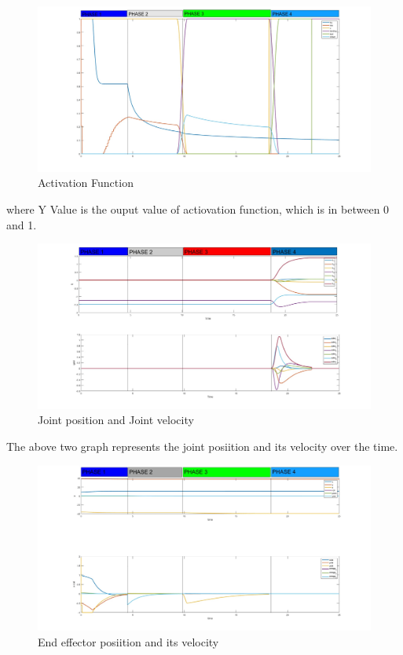 \documentclass{article}
\begin{document}
\begin{figure}[h]
	\centering
	\includegraphics[width=1\textwidth]{imgs/ex1/activation function.jpg}
	\caption{\label{fig:1} Activation Function}
\end{figure}
\noindent
where Y Value is the ouput value of actiovation function, which is in between 0 and 1. 

\begin{figure}[h]
	\centering
	\includegraphics[width=1\textwidth]{imgs/ex1/q and qdot.jpg}
	\caption{\label{fig:2} Joint position and Joint velocity} 
\end{figure}
The above two graph represents the joint posiition and its velocity over the time. 
\begin{figure}[h]
	\centering
	\includegraphics[width=1\textwidth]{imgs/ex1/x and xdot.jpg}
	\caption{\label{fig:1}End effector posiition and its velocity} 
\end{figure}
\end{document}
